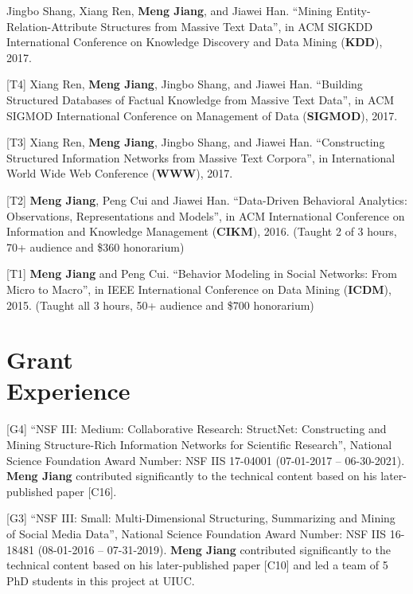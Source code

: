 \documentclass[margin, 9pt]{res}
\begin{document}
\begin{resume}
[T5] Jingbo Shang, Xiang Ren, \textbf{Meng Jiang}, and Jiawei Han. ``Mining Entity-Relation-Attribute Structures from Massive Text Data'', in ACM SIGKDD International Conference on Knowledge Discovery and Data Mining (\textbf{KDD}), 2017.

[T4] Xiang Ren, \textbf{Meng Jiang}, Jingbo Shang, and Jiawei Han. ``Building Structured Databases of Factual Knowledge from Massive Text Data'', in ACM SIGMOD International Conference on Management of Data (\textbf{SIGMOD}), 2017.

[T3] Xiang Ren, \textbf{Meng Jiang}, Jingbo Shang, and Jiawei Han. ``Constructing Structured Information Networks from Massive Text Corpora'', in International World Wide Web Conference (\textbf{WWW}), 2017.

[T2] \textbf{Meng Jiang}, Peng Cui and Jiawei Han. ``Data-Driven Behavioral Analytics: Observations, Representations and Models'', in ACM International Conference on Information and Knowledge Management (\textbf{CIKM}), 2016. (Taught 2 of 3 hours, 70+ audience and \$360 honorarium)

[T1] \textbf{Meng Jiang} and Peng Cui. ``Behavior Modeling in Social Networks: From Micro to Macro'', in IEEE International Conference on Data Mining (\textbf{ICDM}), 2015. (Taught all 3 hours, 50+ audience and \$700 honorarium)


\section{Grant \\ Experience}

[G4] ``NSF III: Medium: Collaborative Research: StructNet: Constructing and Mining Structure-Rich Information Networks for Scientific Research'', National Science Foundation Award Number: NSF IIS 17-04001 (07-01-2017 -- 06-30-2021). \textbf{Meng Jiang} contributed significantly to the technical content based on his later-published paper [C16].

[G3] ``NSF III: Small: Multi-Dimensional Structuring, Summarizing and Mining of Social Media Data'', National Science Foundation Award Number: NSF IIS 16-18481 (08-01-2016 -- 07-31-2019). \textbf{Meng Jiang} contributed significantly to the technical content based on his later-published paper [C10] and led a team of 5 PhD students in this project at UIUC.


\end{resume}
\end{document}
